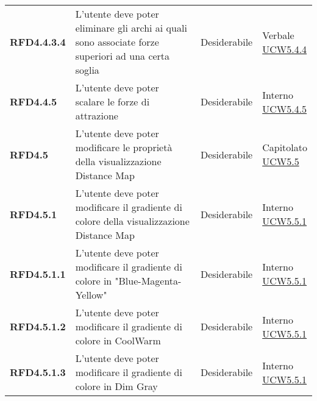 \begin{longtable}[H]{| >{\raggedright\bfseries}m{20mm} | >{\raggedright}m{90mm} | >{\centering}m{25mm} | >{\centering\arraybackslash}m{30mm}|}
    RFD4.4.3.4
     & L'utente deve poter eliminare gli archi ai quali sono associate forze superiori ad una certa soglia
     & Desiderabile
     & \makecell{ Verbale                                                                                                \\ \hyperref[par:ucw5.4.4]{UCW5.4.4} }\\

    RFD4.4.5
     & L'utente deve poter scalare le forze di attrazione
     & Desiderabile
     & \makecell{ Interno                                                                                                \\ \hyperref[par:ucw5.4.5]{UCW5.4.5} }\\

    RFD4.5
     & L'utente deve poter modificare le proprietà della visualizzazione Distance Map
     & Desiderabile
     & \makecell{ Capitolato                                                                                             \\ \hyperref[ssub:ucw5.5]{UCW5.5} }\\

    RFD4.5.1
     & L'utente deve poter modificare il gradiente di colore della visualizzazione Distance Map
     & Desiderabile
     & \makecell{ Interno                                                                                                \\ \hyperref[par:ucw5.5.1]{UCW5.5.1} }\\

    RFD4.5.1.1
     & L'utente deve poter modificare il gradiente di colore in "Blue-Magenta-Yellow"
     & Desiderabile
     & \makecell{ Interno                                                                                                \\ \hyperref[par:ucw5.5.1]{UCW5.5.1} }\\

    RFD4.5.1.2
     & L'utente deve poter modificare il gradiente di colore in CoolWarm
     & Desiderabile
     & \makecell{ Interno                                                                                                \\ \hyperref[par:ucw5.5.1]{UCW5.5.1} }\\

    RFD4.5.1.3
     & L'utente deve poter modificare il gradiente di colore in Dim Gray
     & Desiderabile
     & \makecell{ Interno                                                                                                \\ \hyperref[par:ucw5.5.1]{UCW5.5.1} }\\


\end{longtable}
